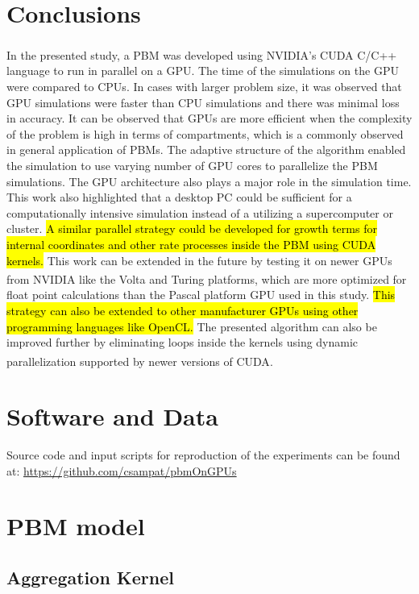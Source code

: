\documentclass[review]{elsarticle}
\begin{document}
\begin{linenumbers}
\section{Conclusions}
\label{secConc}
In the presented study, a PBM was developed using NVIDIA\textsuperscript{\tiny\textregistered}'s  CUDA\textsuperscript{\tiny\textregistered} C/C++ language 
to run in parallel on a GPU. The time of the simulations on the GPU were compared 
to CPUs. In cases with larger problem size, it was observed that GPU simulations 
were faster than CPU simulations and there was minimal loss in accuracy. 
It can be observed that GPUs are more efficient when the complexity of the 
problem is high in terms of compartments, which is a commonly observed in general 
application of PBMs. The adaptive structure of the algorithm 
enabled the simulation to use varying number of GPU cores to parallelize the PBM simulations.
The GPU architecture also plays a major role in the simulation time. This work also 
highlighted that a desktop PC could be sufficient for a computationally intensive 
simulation instead of a utilizing a supercomputer or cluster. \hl{A similar parallel strategy could  
be developed for growth terms for internal coordinates and other rate processes inside the PBM 
using CUDA kernels.} This work can be extended in the future by testing it on newer 
GPUs from NVIDIA\textsuperscript{\tiny\textregistered} 
like the Volta and Turing platforms, which are more optimized for float point calculations 
than the Pascal platform GPU used in this study. \hl{This strategy can also be extended to other 
manufacturer GPUs using other programming languages like OpenCL.}
The presented algorithm can also be 
improved further by eliminating loops inside the kernels using dynamic parallelization 
supported by newer versions of CUDA\textsuperscript{\tiny\textregistered}.


\section*{Software and Data}
\noindent Source code and input scripts for reproduction of the experiments can be found at: 
\url{https://github.com/csampat/pbmOnGPUs}
\appendix

\section{PBM model}
\label{app:A}
\subsection{Aggregation Kernel}
\label{app:aggKernel}


\end{linenumbers}
\end{document}
